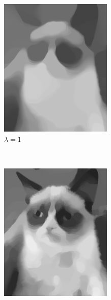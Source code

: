 \documentclass{paper}
\begin{document}
\begin{figure}[ht]
\begin{subfigure}[ht]{0.3\textwidth}
	\includegraphics[width=\textwidth]{result-cat-lambda1-theta0_5-iter1500}
	\caption*{$\lambda = 1$}
\end{subfigure}
~
\begin{subfigure}[ht]{0.3\textwidth}
	\centering
	\includegraphics[width=\textwidth]{result-cat-lambda5-theta0_5-iter1500}

\end{subfigure}
\end{figure}
\end{document}
